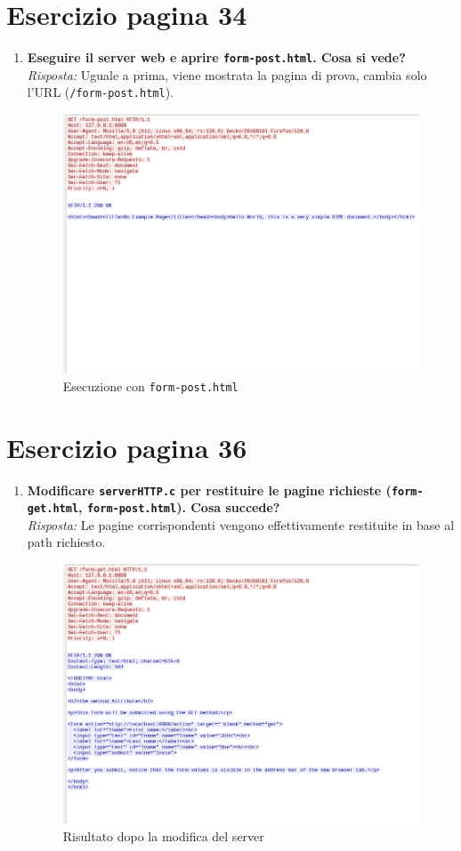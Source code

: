 \documentclass[a4paper,12pt]{article}
\begin{document}
\section*{Esercizio pagina 34}
\begin{enumerate}
  \item \textbf{Eseguire il server web e aprire \texttt{form-post.html}. Cosa si vede?}\\
    \emph{Risposta:} Uguale a prima, viene mostrata la pagina di prova, cambia solo l'URL (\texttt{/form-post.html}).
    \begin{figure}[h]
      \centering
      \includegraphics[width=0.7\linewidth]{form-post.png}
      \caption{Esecuzione con \texttt{form-post.html}}
    \end{figure}
\end{enumerate}

\section*{Esercizio pagina 36}
\begin{enumerate}
  \item \textbf{Modificare \texttt{serverHTTP.c} per restituire le pagine richieste (\texttt{form-get.html}, \texttt{form-post.html}). Cosa succede?}\\
    \emph{Risposta:} Le pagine corrispondenti vengono effettivamente restituite in base al path richiesto.
    \begin{figure}[h]
      \centering
      \includegraphics[width=0.7\linewidth]{form-get_corretto.png}
      \caption{Risultato dopo la modifica del server}
    \end{figure}
\end{enumerate}
\end{document}
